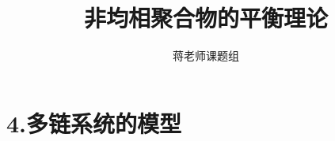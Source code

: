 \documentclass[12pt,a4paper]{article}
\title{非均相聚合物的平衡理论}
\author{蒋老师课题组}
\date{\chntoday}
\begin{document}
\maketitle
\section{4.多链系统的模型}







\cite{tam19912d}

\end{document}
